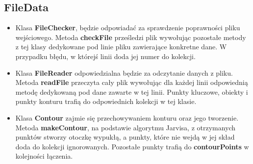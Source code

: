 \documentclass[a4paper,11pt]{article}
\begin{document}
\subsection{FileData}
\begin{itemize}
\item Klasa \textbf{FileChecker}, będzie odpowiadać za sprawdzenie poprawności pliku wejściowego. Metoda \textbf{checkFile} prześledzi plik wywołując pozostałe metody z tej klasy dedykowane pod linie pliku zawierające konkretne dane. W przypadku błędu, w którejś linii doda jej numer do kolekcji.
\item Klasa \textbf{FileReader} odpowiedzialna będzie za odczytanie danych z pliku. Metoda \textbf{readFile} przeczyta cały plik wywołując dla każdej linii odpowiednią metodę dedykowaną pod dane zawarte w tej linii. Punkty kluczowe, obiekty i punkty konturu trafią do odpowiednich kolekcji w tej klasie.
\item Klasa \textbf{Contour} zajmie się przechowywaniem konturu oraz jego tworzenie. Metoda \textbf{makeContour}, na podstawie algorytmu Jarvisa, z otrzymanych punktów stworzy otoczkę wypukłą, a punkty, które nie wejdą w jej skład doda do kolekcji ignorowanych. Pozostałe punkty trafią do \textbf{contourPoints} w kolejności łączenia.
\end{itemize}
\end{document}
